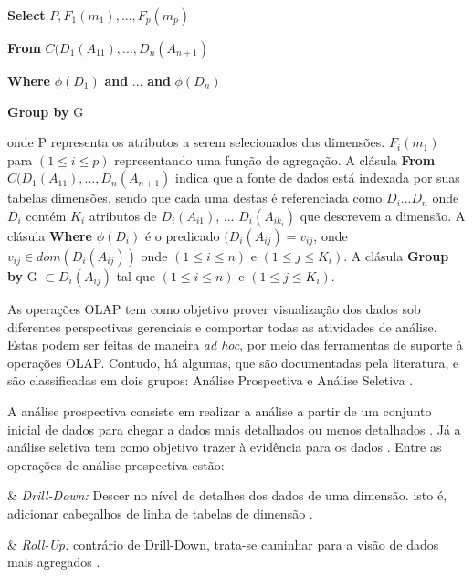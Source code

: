 \textbf{Select} $\displaystyle P,F_{1}(m_1),..., F_p(m_p)$

\textbf{From} $\displaystyle C(D_1(A_{11}),...,D_n(A_{n+1})$

\textbf{Where} $\displaystyle \phi(D_1)$ \textbf{and} ... \textbf{and}  $\displaystyle\phi(D_n)$

\textbf{Group by} G

onde P representa os atributos a serem selecionados das dimensões. $\displaystyle F_{i}(m_1)$ para $\displaystyle (1 \leq i \leq p) $ representando uma função de agregação. A clásula \textbf{From} $\displaystyle C(D_1(A_{11}),...,D_n(A_{n+1})$ indica que a fonte de dados está indexada por suas tabelas dimensões, sendo que cada uma destas é referenciada como $\displaystyle D_i ... D_n $ onde  $\displaystyle D_i $ contém  $\displaystyle K_i$ atributos de  $\displaystyle D_i(A_{i1})$, ... $ \displaystyle D_i(A_{ik_{i}}) $ que descrevem a dimensão.  A clásula \textbf{Where} $\displaystyle \phi(D_i)$ é o predicado $\displaystyle (D_i(A_{ij}) = v_{ij}$, onde $\displaystyle v_{ij} \in dom(D_i(A_{ij}))$ onde $\displaystyle (1 \leq i \leq n) $ e $\displaystyle (1 \leq j \leq K_{i}) $. A clásula \textbf{Group by} G $\displaystyle \subset {D_{i}(A_{ij})} $ tal que $\displaystyle (1 \leq i \leq n) $ e $\displaystyle (1 \leq j \leq K_{i})$.


As operações OLAP tem como objetivo prover visualização dos dados sob diferentes perspectivas gerenciais e comportar todas as atividades de análise. Estas podem ser feitas de maneira \textit{ad hoc}, por meio das ferramentas de suporte à operações OLAP. Contudo, há algumas, que são documentadas pela literatura, e são classificadas em dois grupos: Análise Prospectiva e Análise Seletiva .

A análise prospectiva consiste em realizar a análise a partir de um conjunto inicial de dados para chegar a dados mais detalhados ou menos detalhados \cite{Inmon1992}. Já a análise seletiva tem como objetivo trazer à evidência para os dados \cite{andre2000}. Entre as operações de análise prospectiva estão:

\begin{easylist}[itemize]

& \textit{Drill-Down:} Descer no nível de detalhes dos dados de uma dimensão. isto é, adicionar cabeçalhos de linha de tabelas de dimensão \cite{Kimball2002}.

& \textit{Roll-Up:} contrário de Drill-Down, trata-se caminhar para a visão de dados mais agregados . 


\end{easylist}

